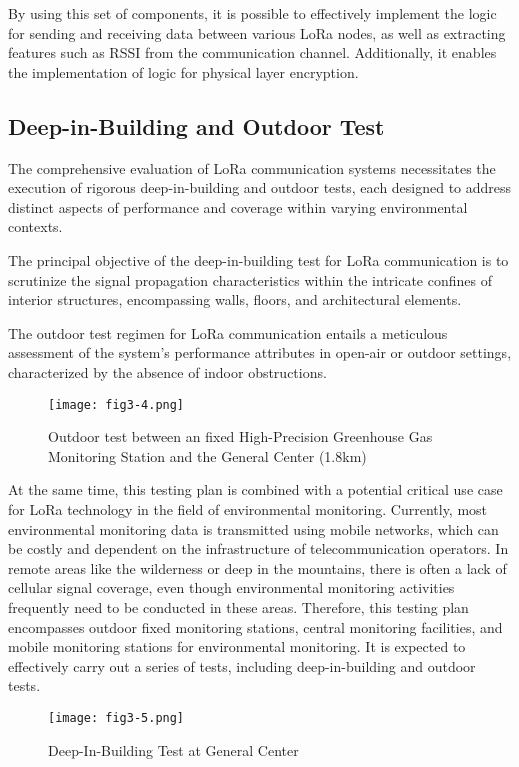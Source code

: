 By using this set of components, it is possible to effectively implement the logic for sending and receiving data between various LoRa nodes, as well as extracting features such as RSSI from the communication channel. Additionally, it enables the implementation of logic for physical layer encryption.


\subsection{Deep-in-Building and Outdoor Test}
The comprehensive evaluation of LoRa communication systems necessitates the execution of rigorous deep-in-building and outdoor tests, each designed to address distinct aspects of performance and coverage within varying environmental contexts.

The principal objective of the deep-in-building test for LoRa communication is to scrutinize the signal propagation characteristics within the intricate confines of interior structures, encompassing walls, floors, and architectural elements.

The outdoor test regimen for LoRa communication entails a meticulous assessment of the system's performance attributes in open-air or outdoor settings, characterized by the absence of indoor obstructions.
\begin{figure}
  \centering
  \texttt{[image: fig3-4.png]}
  \caption{Outdoor test between an fixed High-Precision Greenhouse Gas Monitoring Station and the General Center (1.8km)}
  \label{fig:3-4}
\end{figure}
At the same time, this testing plan is combined with a potential critical use case for LoRa technology in the field of environmental monitoring\cite{8515030}. Currently, most environmental monitoring data is transmitted using mobile networks, which can be costly and dependent on the infrastructure of telecommunication operators. In remote areas like the wilderness or deep in the mountains, there is often a lack of cellular signal coverage, even though environmental monitoring activities frequently need to be conducted in these areas. Therefore, this testing plan encompasses outdoor fixed monitoring stations, central monitoring facilities, and mobile monitoring stations for environmental monitoring. It is expected to effectively carry out a series of tests, including deep-in-building and outdoor tests.
\begin{figure}
  \centering
  \texttt{[image: fig3-5.png]}
  \caption{Deep-In-Building Test at General Center}
  \label{fig:3-5}
\end{figure}

